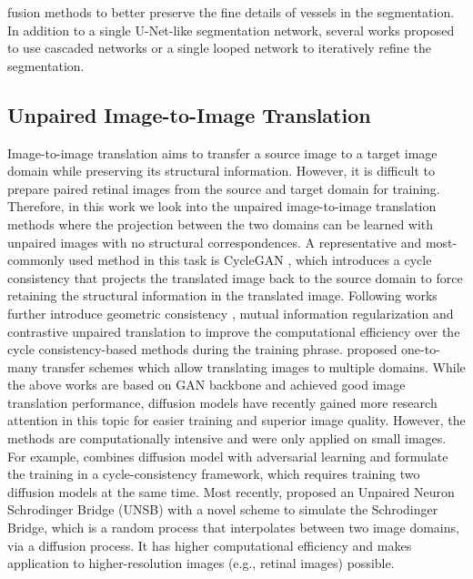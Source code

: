 fusion methods to better preserve the fine details of vessels in the segmentation. In addition to a single U-Net-like segmentation network, several works \cite{Vesseg-CNN-WNet, Vesseg-CNN-WSDMF, Vesseg-CNN-FANet} proposed to use cascaded networks or a single looped network to iteratively refine the segmentation. 

\subsection{Unpaired Image-to-Image Translation} 
Image-to-image translation aims to transfer a source image to a target image domain while preserving its structural information. However, it is difficult to prepare paired retinal images from the source and target domain for training. Therefore, in this work we look into the unpaired image-to-image translation methods where the projection between the two domains can be learned with unpaired images with no structural correspondences. A representative and most-commonly used method in this task is CycleGAN \cite{Trans-CycleGAN}, which introduces a cycle consistency that projects the translated image back to the source domain to force retaining the structural information in the translated image. Following works further introduce geometric consistency \cite{Trans-CcGAN}, mutual information regularization \cite{Trans-Mutual} and contrastive unpaired translation \cite{Trans-CUT} to improve the computational efficiency over the cycle consistency-based methods during the training phrase. \cite{Trans-MUIST, Trans-StarGAN} proposed one-to-many transfer schemes which allow translating images to multiple domains. While the above works are based on GAN backbone and achieved good image translation performance, diffusion models \cite{Others-Diffusion, Others-DDPM, Others-DDIM} have recently gained more research attention in this topic for easier training and superior image quality. However, the methods \cite{Trans-DDIB, Trans-ENOT, Trans-SynDiff} are computationally intensive and were only applied on small images. For example, \cite{Trans-SynDiff} combines diffusion model with adversarial learning and formulate the training in a cycle-consistency framework, which requires training two diffusion models at the same time. Most recently, \cite{Trans-UNSB} proposed an Unpaired Neuron Schrodinger Bridge (UNSB) with a novel scheme to simulate the Schrodinger Bridge, which is a random process that interpolates between two image domains, via a diffusion process. It has higher computational efficiency and makes application to higher-resolution images (e.g., retinal images) possible.


